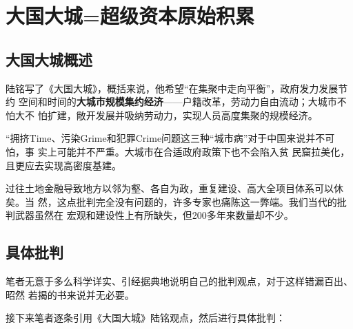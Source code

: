\begin{quotation}
\end{quotation}

\section{大国大城=超级资本原始积累}

\subsection{大国大城概述}

陆铭写了《大国大城》，概括来说，他希望“在集聚中走向平衡”，政府发力发展节约
空间和时间的\textbf{大城市规模集约经济}——户籍改革，劳动力自由流动；大城市不怕大不
怕扩建，敞开发展并吸纳劳动力，实现人员高度集聚的规模经济。

“拥挤Time、污染Grime和犯罪Crime问题这三种“城市病”对于中国来说并不可怕，事
实上可能并不严重。大城市在合适政府政策下也不会陷入贫
民窟拉美化，且更应去实现高密度基建。

过往土地金融导致地方以邻为壑、各自为政，重复建设、高大全项目体系可以休矣。当
然，这点批判完全没有问题的，许多专家也痛陈这一弊端。我们当代的批判武器虽然在
宏观和建设性上有所缺失，但200多年来数量却不少。

\subsection{具体批判}

笔者无意于多么科学详实、引经据典地说明自己的批判观点，对于这样错漏百出、昭然
若揭的书来说并无必要。

接下来笔者逐条引用《大国大城》陆铭观点，然后进行具体批判：

